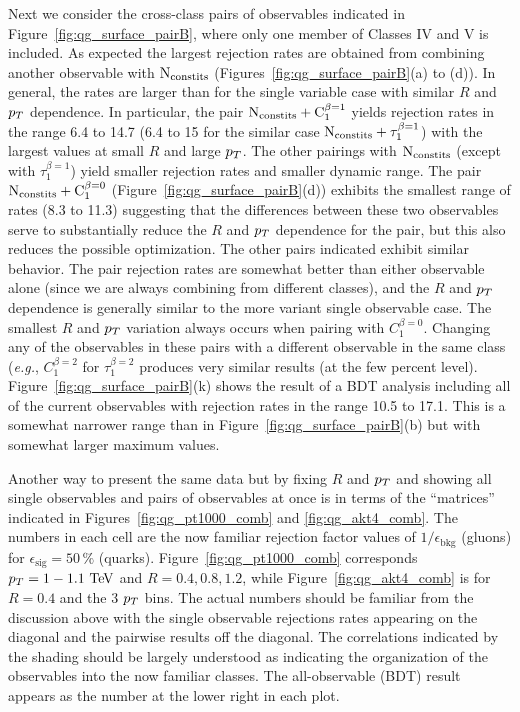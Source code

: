 Next we consider the cross-class pairs of observables indicated in Figure~\ref{fig:qg_surface_pairB}, where only one member of
Classes IV and V is included.  As expected the largest rejection
rates are obtained from combining another observable with $\rm{N_ {constits}}$ (Figures~\ref{fig:qg_surface_pairB}(a) to (d)).  
In general, the rates are larger
than for the single variable case with similar $R$ and $p_T$ dependence.  In particular, the pair $\rm{N_ {constits}}+ C_1^{\beta=1}$ 
yields rejection rates in the range 6.4 to 14.7 (6.4 to 15 for the similar case $\rm{N_ {constits}}+ \tau_1^{\beta=1}$) with the largest
values at small $R$ and large $p_T$.  The other pairings with $\rm{N_ {constits}}$ (except with $\tau_1^{\beta=1}$) yield smaller 
rejection rates and smaller dynamic range.  The pair $\rm{N_ {constits}}+ C_1^{\beta=0}$ (Figure~\ref{fig:qg_surface_pairB}(d)) exhibits
the smallest range of rates (8.3 to 11.3) suggesting that the differences between these two observables serve to substantially 
reduce the $R$ and $p_T$ dependence for the pair, but this also reduces the possible optimization.  The other pairs indicated exhibit
similar behavior.  The pair rejection rates are somewhat better than either observable alone (since we are always combining from different classes),
and the $R$ and $p_T$ dependence is generally similar to the more variant single observable case.  The smallest $R$ and $p_T$ variation always occurs 
when pairing with $C_1^{\beta=0}$.  Changing any of the observables in these pairs with a different observable in the same class (\textit{e.g.},
$C_1^{\beta=2}$ for $\tau_1^{\beta=2}$ produces very similar results (at the few percent level).  Figure~\ref{fig:qg_surface_pairB}(k) shows the
result of a BDT analysis including all of the current observables with rejection rates in the range 10.5 to 17.1.  This is a somewhat narrower range
than in Figure~\ref{fig:qg_surface_pairB}(b) but with somewhat larger maximum values.

Another way to present the same data but by fixing $R$ and $p_T$ and showing all single observables and pairs of observables at once is in terms of the 
``matrices'' indicated in Figures~\ref{fig:qg_pt1000_comb} and \ref{fig:qg_akt4_comb}.  The numbers in each cell are the now familiar rejection factor
values of $1/\epsilon_\text{bkg}$ (gluons) for $\epsilon_\text{sig}= 50\,\% $ (quarks).  Figure~\ref{fig:qg_pt1000_comb} corresponds $\pt=1-1.1 \TeV$ and
$R =0.4,0.8,1.2$, while  Figure~\ref{fig:qg_akt4_comb} is for $R = 0.4$ and the 3 $p_T$ bins.  The actual numbers should be familiar from the discussion
above with the single observable rejections rates appearing on the diagonal and the pairwise results off the diagonal. 
The correlations indicated by the shading should be largely understood as indicating the organization of the observables into the now familiar
classes.  The all-observable (BDT) result appears as the number at the lower right in each plot.

